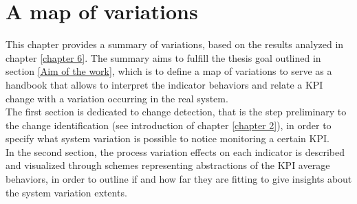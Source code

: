 \chapter{A map of variations}
\label{chapter 7}
\ifpdf
    \graphicspath{{Chapter7/Figs/}{Chapter7/Figs/PDF/}{Chapter7/Figs/}}
\else
    \graphicspath{{Chapter7/Figs/Vector/}{Chapter7/Figs/}}
\fi
This chapter provides a summary of variations, based on the results analyzed in chapter \ref{chapter 6}. The summary aims to fulfill the thesis goal outlined in section \ref{Aim of the work}, which is to define a map of variations to serve as a handbook that allows to interpret the indicator behaviors and relate a KPI change with a variation occurring in the real system. \\
The first section is dedicated to change detection, that is the step preliminary to the change identification (see introduction of chapter \ref{chapter 2}), in order to specify what system variation is possible to notice monitoring a certain KPI. \\In the second section, the process variation effects on each indicator is described and visualized through schemes representing abstractions of the KPI average behaviors, in order to outline if and how far they are fitting to give insights about the system variation extents. 
